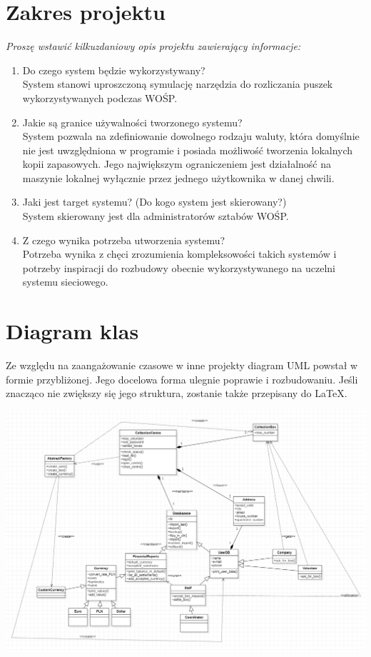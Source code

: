 \documentclass{article}
\begin{document}
\makeheader

\section{Zakres projektu}
{\small\it Proszę wstawić kilkuzdaniowy opis projektu zawierający informacje:
\begin{enumerate}
    \item Do czego system będzie wykorzystywany?
    \\
    \textup{System stanowi uproszczoną symulację narzędzia do rozliczania puszek wykorzystywanych podczas WOŚP.}
    \item Jakie są granice używalności tworzonego systemu?
    \\
    \textup{System pozwala na zdefiniowanie dowolnego rodzaju waluty, która domyślnie nie jest uwzględniona w programie i posiada możliwość tworzenia lokalnych kopii zapasowych. Jego największym ograniczeniem jest działalność na maszynie lokalnej wyłącznie przez jednego użytkownika w danej chwili.}
    \item Jaki jest target systemu? (Do kogo system jest skierowany?)
    \\
    \textup{System skierowany jest dla administratorów sztabów WOŚP.}
    \item Z czego wynika potrzeba utworzenia systemu?
    \\
    \textup{Potrzeba wynika z chęci zrozumienia kompleksowości takich systemów i potrzeby inspiracji do rozbudowy obecnie wykorzystywanego na uczelni systemu sieciowego.}
\end{enumerate}}
\section{Diagram klas}
\textup{Ze względu na zaangażowanie czasowe w inne projekty diagram UML powstał w formie przybliżonej. Jego docelowa forma ulegnie poprawie i rozbudowaniu. Jeśli znacząco nie zwiększy się jego struktura, zostanie także przepisany do LaTeX.}

\includegraphics[width=\textwidth]{UML_v01.png}
\end{document}
